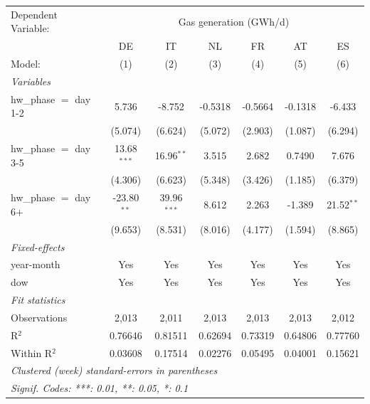 
\begingroup
\centering
\begin{tabular}{lcccccc}
   \tabularnewline \midrule \midrule
   Dependent Variable: & \multicolumn{6}{c}{Gas generation (GWh/d)}\\
                          & DE            & IT            & NL      & FR      & AT      & ES \\   
   Model:                 & (1)           & (2)           & (3)     & (4)     & (5)     & (6)\\  
   \midrule
   \emph{Variables}\\
   hw\_phase $=$ day 1-2  & 5.736         & -8.752        & -0.5318 & -0.5664 & -0.1318 & -6.433\\   
                          & (5.074)       & (6.624)       & (5.072) & (2.903) & (1.087) & (6.294)\\   
   hw\_phase $=$ day 3-5  & 13.68$^{***}$ & 16.96$^{**}$  & 3.515   & 2.682   & 0.7490  & 7.676\\   
                          & (4.306)       & (6.623)       & (5.348) & (3.426) & (1.185) & (6.379)\\   
   hw\_phase $=$ day 6+   & -23.80$^{**}$ & 39.96$^{***}$ & 8.612   & 2.263   & -1.389  & 21.52$^{**}$\\   
                          & (9.653)       & (8.531)       & (8.016) & (4.177) & (1.594) & (8.865)\\   
   \midrule
   \emph{Fixed-effects}\\
   year-month             & Yes           & Yes           & Yes     & Yes     & Yes     & Yes\\  
   dow                    & Yes           & Yes           & Yes     & Yes     & Yes     & Yes\\  
   \midrule
   \emph{Fit statistics}\\
   Observations           & 2,013         & 2,011         & 2,013   & 2,013   & 2,013   & 2,012\\  
   R$^2$                  & 0.76646       & 0.81511       & 0.62694 & 0.73319 & 0.64806 & 0.77760\\  
   Within R$^2$           & 0.03608       & 0.17514       & 0.02276 & 0.05495 & 0.04001 & 0.15621\\  
   \midrule \midrule
   \multicolumn{7}{l}{\emph{Clustered (week) standard-errors in parentheses}}\\
   \multicolumn{7}{l}{\emph{Signif. Codes: ***: 0.01, **: 0.05, *: 0.1}}\\
\end{tabular}
\par\endgroup


